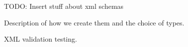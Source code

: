 TODO: Insert stuff about xml schemas

Description of how we create them and the choice of types. 

XML validation testing.